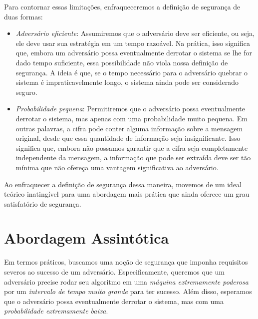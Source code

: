 Para contornar essas limitações, enfraqueceremos a definição de segurança de duas formas:
\begin{itemize}
\item {\em Adversário eficiente}:
  Assumiremos que o adversário deve ser eficiente, ou seja, ele deve usar sua estratégia em um tempo razoável.
  Na prática, isso significa que, embora um adversário possa eventualmente derrotar o sistema se lhe for dado tempo suficiente, essa possibilidade não viola nossa definição de segurança.
  A ideia é que, se o tempo necessário para o adversário quebrar o sistema é impraticavelmente longo, o sistema ainda pode ser considerado seguro.
\item {\em Probabilidade pequena}:
  Permitiremos que o adversário possa eventualmente derrotar o sistema, mas apenas com uma probabilidade muito pequena.
  Em outras palavras, a cifra pode conter alguma informação sobre a mensagem original, desde que essa quantidade de informação seja insignificante.
  Isso significa que, embora não possamos garantir que a cifra seja completamente independente da mensagem, a informação que pode ser extraída deve ser tão mínima que não ofereça uma vantagem significativa ao adversário.
\end{itemize}

Ao enfraquecer a definição de segurança dessa maneira, movemos de um ideal teórico inatingível para uma abordagem mais prática que ainda oferece um grau satisfatório de segurança.

\section{Abordagem Assintótica}
\label{sec:abord-assint}

Em termos práticos, buscamos uma noção de segurança que imponha requisitos severos ao sucesso de um adversário.
Especificamente, queremos que um adversário precise rodar seu algoritmo em uma {\em máquina extremamente poderosa} por um {\em intervalo de tempo muito grande} para ter sucesso.
Além disso, esperamos que o adversário possa eventualmente derrotar o sistema, mas com uma {\em probabilidade extremamente baixa}.

